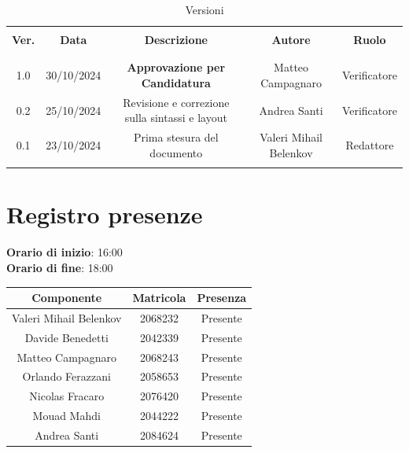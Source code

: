 \documentclass[italian, 12pt]{article}
\begin{document}
\pagestyle{mystyle}


\begin{table}[!h]
	\caption{Versioni}
	\begin{center}
		\begin{tabular}{ c c c c c}
			\hline \\[-2ex]
			\textbf{Ver.} & \textbf{Data} & \textbf{Descrizione} & \textbf{Autore} & \textbf{Ruolo}  \\
			\\[-2ex] \hline \\[-1.5ex]
            1.0 & 30/10/2024 & \textbf{Approvazione per Candidatura} & Matteo Campagnaro & Verificatore\\
            0.2 & 25/10/2024 & Revisione e correzione sulla sintassi e layout & Andrea Santi & Verificatore\\
			0.1 & 23/10/2024 & Prima stesura del documento & Valeri Mihail Belenkov & Redattore\\
			\\[-1.5ex] \hline
		\end{tabular}
	\end{center}
\end{table}


\tableofcontents
\newpage


\section{Registro presenze}

\textbf{Orario di inizio}: 16:00\\
\textbf{Orario di fine}: 18:00\\


\begin{flushleft}
	\begin{table}[!h]
	\begin{tabular}{ |c|c|c| } 
		\hline
		\textbf{Componente} & \textbf{Matricola} & \textbf{Presenza} \\
  \hline 
		Valeri Mihail Belenkov & 2068232 & Presente \\
		Davide Benedetti 	& 2042339 & Presente \\
		Matteo Campagnaro	& 2068243 & Presente \\
		Orlando Ferazzani 	& 2058653 & Presente \\
		Nicolas Fracaro 	& 2076420 & Presente \\
		Mouad Mahdi		    & 2044222 & Presente \\ 
		Andrea Santi 	    & 2084624 & Presente \\
		\hline
	\end{tabular}
	\end{table}
	\end{flushleft}
\end{document}
